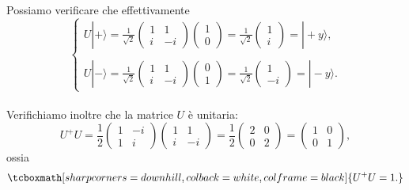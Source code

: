 Possiamo verificare che effettivamente
	\begin{equation}
		\begin{cases}
		U | + \rangle = \frac{1}{\sqrt{2}}
		\begin{pmatrix}
		1 & 1 \\
		i & -i
		\end{pmatrix}
		\begin{pmatrix}
		1\\
		0
		\end{pmatrix}=
		\frac{1}{\sqrt{2}}
		\begin{pmatrix}
		1\\
		i
		\end{pmatrix}=
		| +y \rangle , \\
		\\
		U | - \rangle= \frac{1}{\sqrt{2}}
		\begin{pmatrix}
		1 & 1 \\
		i & -i
		\end{pmatrix}
		\begin{pmatrix}
		0\\
		1
		\end{pmatrix}=
		\frac{1}{\sqrt{2}}
		\begin{pmatrix}
		1\\
		-i
		\end{pmatrix}=
		| -y \rangle . 
		\end{cases}
	\end{equation}\\
	
Verifichiamo inoltre che la matrice $U$ è unitaria:
	\begin{equation}
		U^+U = \frac{1}{2}
		\begin{pmatrix}
		1 & -i\\
		1 & i
		\end{pmatrix}
		\begin{pmatrix}
		1 & 1\\
		i & -i
		\end{pmatrix}=
		\frac{1}{2}
		\begin{pmatrix}
		2 & 0\\
		0 & 2
		\end{pmatrix}=
		\begin{pmatrix}
		1 & 0\\
		0 &1
		\end{pmatrix} , 
	\end{equation}
ossia
	\begin{equation}
		\tcboxmath[sharp corners=downhill, colback=white, colframe=black]{
			U^+U=1 .
			} 
	\end{equation}\\

